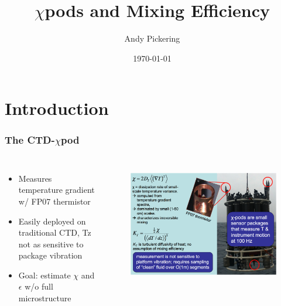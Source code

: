 \documentclass{beamer}
\title{$\chi$pods and Mixing Efficiency}
\author{Andy Pickering}
\date{\today}
\begin{document}
\frame{\titlepage}

\section[Outline]{}
\frame{\tableofcontents}


\section{Introduction}


\begin{frame}
 \frametitle{The CTD-$\chi$pod}

\begin{columns}

   \begin{itemize}
  \item Measures temperature gradient w/ FP07 thermistor
  \item Easily deployed on traditional CTD, Tz not as sensitive to package vibration
  \item Goal: estimate $\chi$ and $\epsilon$ w/o full microstructure
  \end{itemize}


\begin{figure}[htbp]
\begin{center}
\includegraphics[scale=0.35]{chipod_slide.png}
\label{default}
\end{center}
\end{figure}

\end{columns}

\end{frame}
\end{document}
